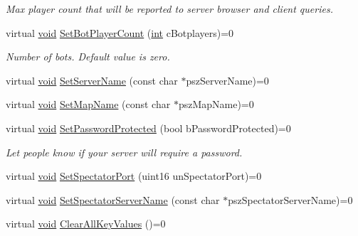 \begin{DoxyCompactItemize}
\begin{DoxyCompactList}\small\item\em Max player count that will be reported to server browser and client queries. \end{DoxyCompactList}\item 
\hypertarget{classISteamGameServer_a0aeedc7ac0d018e43fd63df22ed824f5}{}virtual \hyperlink{SDL__audio_8h_a52835ae37c4bb905b903cbaf5d04b05f}{void} \hyperlink{classISteamGameServer_a0aeedc7ac0d018e43fd63df22ed824f5}{Set\+Bot\+Player\+Count} (\hyperlink{SDL__thread_8h_a6a64f9be4433e4de6e2f2f548cf3c08e}{int} c\+Botplayers)=0\label{classISteamGameServer_a0aeedc7ac0d018e43fd63df22ed824f5}

\begin{DoxyCompactList}\small\item\em Number of bots. Default value is zero. \end{DoxyCompactList}\item 
virtual \hyperlink{SDL__audio_8h_a52835ae37c4bb905b903cbaf5d04b05f}{void} \hyperlink{classISteamGameServer_ab5f99b45fcc464d230d7cebad1ab149c}{Set\+Server\+Name} (const char $\ast$psz\+Server\+Name)=0
\item 
virtual \hyperlink{SDL__audio_8h_a52835ae37c4bb905b903cbaf5d04b05f}{void} \hyperlink{classISteamGameServer_a990b3a4d52dfd3353252bb3590274016}{Set\+Map\+Name} (const char $\ast$psz\+Map\+Name)=0
\item 
\hypertarget{classISteamGameServer_ae518b4d7875d0867431573715f03e071}{}virtual \hyperlink{SDL__audio_8h_a52835ae37c4bb905b903cbaf5d04b05f}{void} \hyperlink{classISteamGameServer_ae518b4d7875d0867431573715f03e071}{Set\+Password\+Protected} (bool b\+Password\+Protected)=0\label{classISteamGameServer_ae518b4d7875d0867431573715f03e071}

\begin{DoxyCompactList}\small\item\em Let people know if your server will require a password. \end{DoxyCompactList}\item 
virtual \hyperlink{SDL__audio_8h_a52835ae37c4bb905b903cbaf5d04b05f}{void} \hyperlink{classISteamGameServer_a7057995594c62bb0c20d7c52c684380e}{Set\+Spectator\+Port} (uint16 un\+Spectator\+Port)=0
\item 
virtual \hyperlink{SDL__audio_8h_a52835ae37c4bb905b903cbaf5d04b05f}{void} \hyperlink{classISteamGameServer_a076fbd010db81fc49b64db24d83d02d7}{Set\+Spectator\+Server\+Name} (const char $\ast$psz\+Spectator\+Server\+Name)=0
\item 
\hypertarget{classISteamGameServer_a74225bfdc7f75e29de3db649334fde7c}{}virtual \hyperlink{SDL__audio_8h_a52835ae37c4bb905b903cbaf5d04b05f}{void} \hyperlink{classISteamGameServer_a74225bfdc7f75e29de3db649334fde7c}{Clear\+All\+Key\+Values} ()=0\label{classISteamGameServer_a74225bfdc7f75e29de3db649334fde7c}


\end{DoxyCompactItemize}
